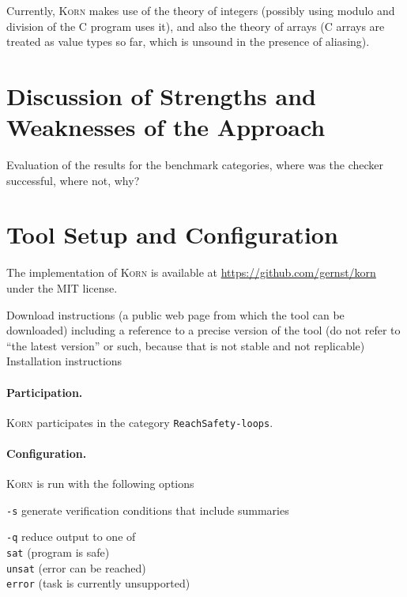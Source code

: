 \documentclass{llncs}
\newcommand{\Korn}{\textsc{Korn}\xspace}
\begin{document}
Currently, \Korn makes use of the theory of integers (possibly using modulo and division of the C program uses it),
and also the theory of arrays (C arrays are treated as value types so far, which is unsound in the presence of aliasing).

\section{Discussion of Strengths and Weaknesses of the Approach}
\label{sec:discussion}

Evaluation of the results for the benchmark categories, where was the checker successful, where not, why?

\section{Tool Setup and Configuration}
\label{sec:project}

The implementation of \Korn is available at
    \url{https://github.com/gernst/korn} under the MIT license.

    Download instructions (a public web page from which the tool can be downloaded) including a reference to a precise version of the tool (do not refer to ``the latest version'' or such, because that is not stable and not replicable)
    Installation instructions

\paragraph{Participation.} \Korn participates in the category \texttt{ReachSafety-loops}.

\paragraph{Configuration.} \Korn is run with the following options

\medskip

\texttt{-s}
    \tabto{2cm} generate verification conditions that include summaries

\medskip

\texttt{-q}
    \tabto{2cm} reduce output to one of \\
    \tabto{2cm} \texttt{sat}   \tabto{3cm} (program is safe) \\
    \tabto{2cm} \texttt{unsat} \tabto{3cm} (error can be reached) \\
    \tabto{2cm} \texttt{error} \tabto{3cm} (task is currently unsupported)
\end{document}
